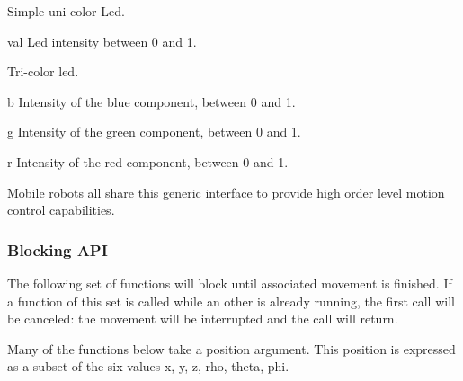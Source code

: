 
Simple uni-color Led.

\begin{urbiscriptapi}
\item[val] Led intensity between 0 and 1.
\end{urbiscriptapi}


Tri-color led.

\begin{urbiscriptapi}
\item[b] Intensity of the blue component, between 0 and 1.


\item[g] Intensity of the green component, between 0 and 1.


\item[r] Intensity of the red component, between 0 and 1.
\end{urbiscriptapi}





Mobile robots all share this generic interface to provide high order
level motion control capabilities.

\subsubsection{Blocking API}

The following set of functions will block until associated movement is
finished.  If a function of this set is called while an other is already
running, the first call will be canceled: the movement will be interrupted
and the call will return.

Many of the functions below take a position argument. This position is
expressed as a subset of the six values x, y, z, rho, theta, phi.

